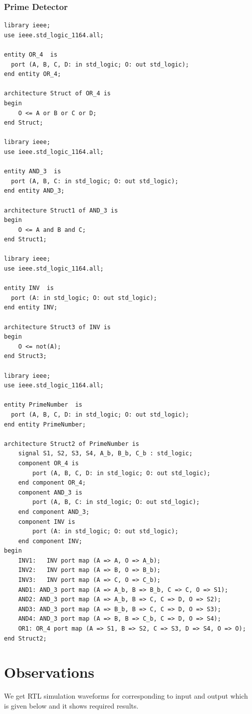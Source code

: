 \documentclass[12pt]{article}
\begin{document}
\subsubsection{Prime Detector}
\begin{verbatim}
library ieee;
use ieee.std_logic_1164.all;

entity OR_4  is
  port (A, B, C, D: in std_logic; O: out std_logic);
end entity OR_4;

architecture Struct of OR_4 is
begin
	O <= A or B or C or D;
end Struct;

library ieee;
use ieee.std_logic_1164.all;

entity AND_3  is
  port (A, B, C: in std_logic; O: out std_logic);
end entity AND_3;

architecture Struct1 of AND_3 is
begin
	O <= A and B and C;
end Struct1;

library ieee;
use ieee.std_logic_1164.all;

entity INV  is
  port (A: in std_logic; O: out std_logic);
end entity INV;

architecture Struct3 of INV is
begin
	O <= not(A);
end Struct3;

library ieee;
use ieee.std_logic_1164.all;

entity PrimeNumber  is
  port (A, B, C, D: in std_logic; O: out std_logic);
end entity PrimeNumber;

architecture Struct2 of PrimeNumber is
	signal S1, S2, S3, S4, A_b, B_b, C_b : std_logic;
	component OR_4 is
		port (A, B, C, D: in std_logic; O: out std_logic);
	end component OR_4;
	component AND_3 is
		port (A, B, C: in std_logic; O: out std_logic);
	end component AND_3;
	component INV is
		port (A: in std_logic; O: out std_logic);
	end component INV;
begin
	INV1:	INV port map (A => A, O => A_b);
	INV2:	INV port map (A => B, O => B_b);
	INV3:	INV port map (A => C, O => C_b);
	AND1: AND_3 port map (A => A_b, B => B_b, C => C, O => S1);
	AND2: AND_3 port map (A => A_b, B => C, C => D, O => S2);
	AND3: AND_3 port map (A => B_b, B => C, C => D, O => S3);
	AND4: AND_3 port map (A => B, B => C_b, C => D, O => S4);
	OR1: OR_4 port map (A => S1, B => S2, C => S3, D => S4, O => O);
end Struct2;
\end{verbatim}

\section{Observations}
 
We get RTL simulation waveforms for corresponding to input and output which is given below and it shows required results.
\end{document}
